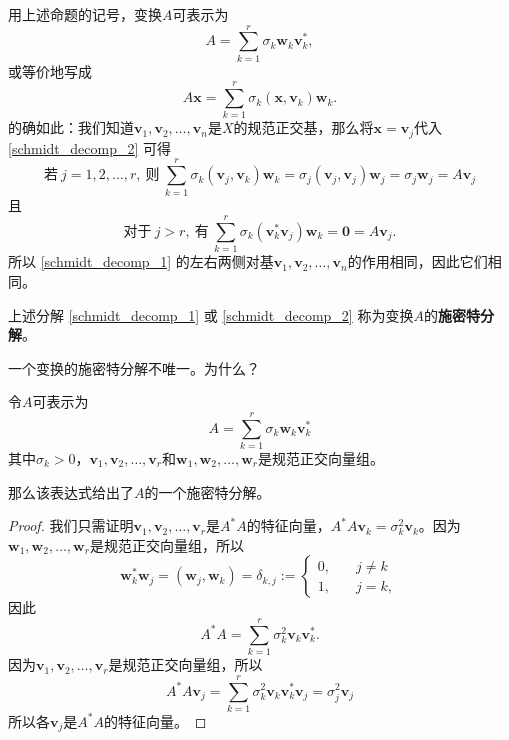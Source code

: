 用上述命题的记号，变换$A$可表示为
\begin{equation}\label{schmidt_decomp_1}
    A=\sum_{k=1}^r\sigma_k\mathbf{w}_k\mathbf{v}_k^*,
\end{equation}
或等价地写成
\begin{equation}\label{schmidt_decomp_2}
    A\mathbf{x}=\sum_{k=1}^r\sigma_k(\mathbf{x},\mathbf{v}_k)\mathbf{w}_k.
\end{equation}
的确如此：我们知道$\mathbf{v}_{1},\mathbf{v}_{2},\ldots,\mathbf{v}_{n}$是$X$的规范正交基，那么将$\mathbf{x}=\mathbf{v}_j$代入 \eqref{schmidt_decomp_2} 可得
\[\text{若}~j=1,2,\ldots,r,~\text{则}~\sum_{k=1}^r\sigma_k(\mathbf{v}_j,\mathbf{v}_k)\mathbf{w}_k=\sigma_j(\mathbf{v}_j,\mathbf{v}_j)\mathbf{w}_j=\sigma_j\mathbf{w}_j=A\mathbf{v}_j\]
且\[\text{对于}~j>r,~\text{有}~\sum_{k=1}^r\sigma_k(\mathbf{v}_k^*\mathbf{v}_j)\mathbf{w}_k=\mathbf{0}=A\mathbf{v}_j.\]
所以 \eqref{schmidt_decomp_1} 的左右两侧对基$\mathbf{v}_{1},\mathbf{v}_{2},\ldots,\mathbf{v}_{n}$的作用相同，因此它们相同。

\begin{definition*}
    上述分解 \eqref{schmidt_decomp_1} 或 \eqref{schmidt_decomp_2} 称为变换$A$的{\bf 施密特分解}。
\end{definition*}
\begin{remark*}
    一个变换的施密特分解不唯一。为什么？
\end{remark*}
\begin{lemma}
    令$A$可表示为\[A=\sum_{k=1}^r\sigma_k\mathbf{w}_k\mathbf{v}_k^*\]
    其中$\sigma_k>0$，$\mathbf{v}_{1},\mathbf{v}_{2},\ldots,\mathbf{v}_{r}$和$\mathbf{w}_{1},\mathbf{w}_{2},\ldots,\mathbf{w}_{r}$是规范正交向量组。
    
    那么该表达式给出了$A$的一个施密特分解。
\end{lemma}

\begin{proof}
    我们只需证明$\mathbf{v}_{1},\mathbf{v}_{2},\ldots,\mathbf{v}_{r}$是$A^*A$的特征向量，$A^{*}A\mathbf{v}_{k}=\sigma_{k}^{2}\mathbf{v}_{k}$。因为$\mathbf{w}_{1},\mathbf{w}_{2},\ldots,\mathbf{w}_{r}$是规范正交向量组，所以
    \[\mathbf{w}_k^*\mathbf{w}_j=(\mathbf{w}_j,\mathbf{w}_k)=\delta_{k,j}:=\left\{\begin{array}{ll}0,&\quad j\neq k\\1,&\quad j=k,\end{array}\right.\]
    因此\[A^{*}A=\sum_{k=1}^{r}\sigma_{k}^{2}\mathbf{v}_{k}\mathbf{v}_{k}^{*}.\]
    因为$\mathbf{v}_{1},\mathbf{v}_{2},\ldots,\mathbf{v}_{r}$是规范正交向量组，所以\[A^*A\mathbf{v}_j=\sum_{k=1}^r\sigma_k^2\mathbf{v}_k\mathbf{v}_k^*\mathbf{v}_j=\sigma_j^2\mathbf{v}_j\]
    所以各$\mathbf{v}_j$是$A^*A$的特征向量。
\end{proof}

